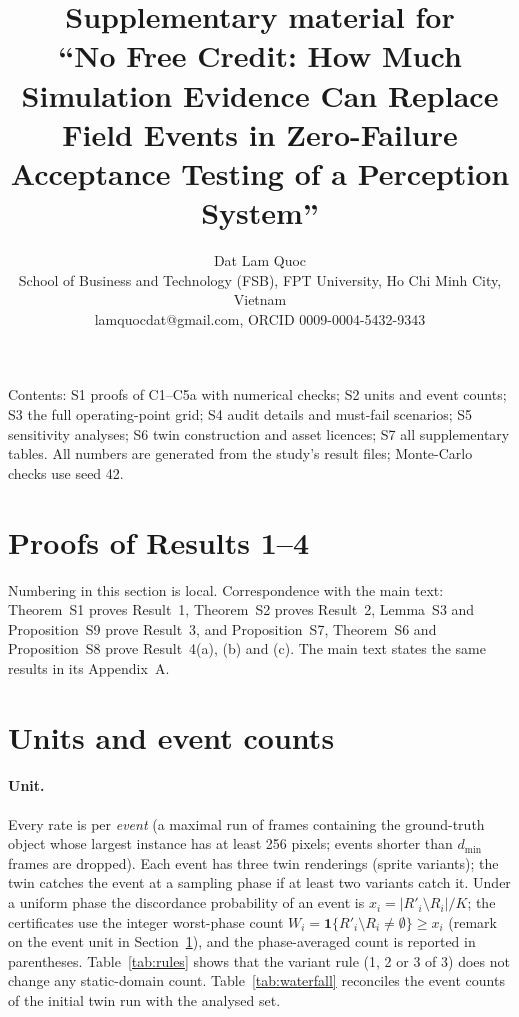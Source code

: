 \documentclass[11pt]{article}
\title{Supplementary material for\\ ``No Free Credit: How Much Simulation Evidence Can Replace Field Events in
Zero-Failure Acceptance Testing of a Perception System''}
\author{Dat Lam Quoc\\ \small School of Business and Technology (FSB), FPT University, Ho Chi Minh City, Vietnam\\ \small lamquocdat@gmail.com, ORCID 0009-0004-5432-9343}
\date{}
\theoremstyle{definition}
\theoremstyle{remark}
\begin{document}
\maketitle

\noindent Contents: S1 proofs of C1--C5a with numerical checks; S2 units and event counts; S3 the full operating-point
grid; S4 audit details and must-fail scenarios; S5 sensitivity analyses; S6 twin construction and asset licences;
S7 all supplementary tables.
All numbers are generated from the study's result files; Monte-Carlo checks use seed 42.

\section{Proofs of Results 1--4}\label{sec:proofs}
Numbering in this section is local. Correspondence with the main text: Theorem~S1 proves Result~1, Theorem~S2
proves Result~2, Lemma~S3 and Proposition~S9 prove Result~3, and Proposition~S7, Theorem~S6 and Proposition~S8
prove Result~4(a), (b) and (c). The main text states the same results in its Appendix~A.
\renewcommand{\thetheorem}{S\arabic{theorem}}
{\let\section\subsection

}

\section{Units and event counts}\label{sec:units}
\paragraph{Unit.} Every rate is per \emph{event} (a maximal run of frames containing the ground-truth object whose
largest instance has at least 256 pixels; events shorter than $d_{\min}$ frames are dropped). Each event has three twin
renderings (sprite variants); the twin catches the event at a sampling phase if at least two variants catch it. Under a
uniform phase the discordance probability of an event is $x_i=|R'_i\setminus R_i|/K$; the certificates use the
integer worst-phase count $W_i=\mathbf 1\{R'_i\setminus R_i\ne\emptyset\}\ge x_i$ (remark on the event unit in Section~\ref{sec:proofs}), and the phase-averaged count is reported in parentheses. Table~\ref{tab:rules} shows that the variant
rule (1, 2 or 3 of 3) does not change any static-domain count. Table~\ref{tab:waterfall} reconciles the event counts
of the initial twin run with the analysed set.
\end{document}
